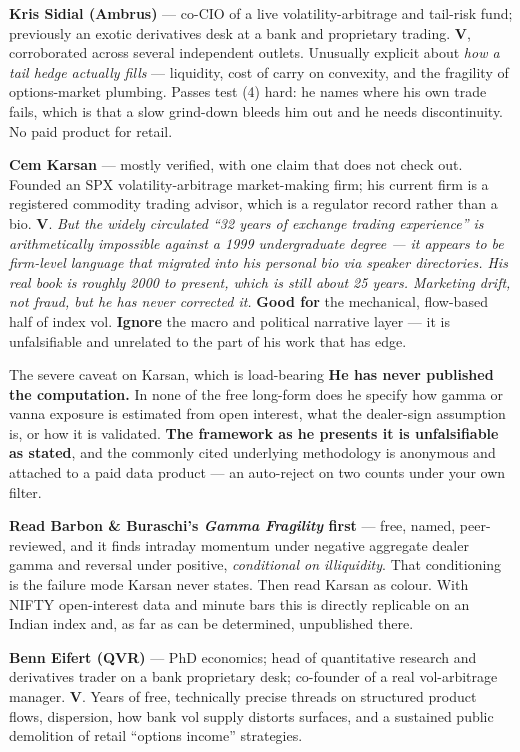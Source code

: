 \documentclass[11pt,a4paper]{article}
\begin{document}
\textbf{Kris Sidial (Ambrus)} --- co-CIO of a live volatility-arbitrage and
tail-risk fund; previously an exotic derivatives desk at a bank and proprietary
trading. \textbf{V}, corroborated across several independent outlets. Unusually
explicit about \emph{how a tail hedge actually fills} --- liquidity, cost of carry
on convexity, and the fragility of options-market plumbing. Passes test (4) hard:
he names where his own trade fails, which is that a slow grind-down bleeds him out
and he needs discontinuity. No paid product for retail.

\textbf{Cem Karsan} --- mostly verified, with one claim that does not check out.
Founded an SPX volatility-arbitrage market-making firm; his current firm is a
registered commodity trading advisor, which is a regulator record rather than a
bio. \textbf{V}. \emph{But the widely circulated ``32 years of exchange trading
experience'' is arithmetically impossible against a 1999 undergraduate degree ---
it appears to be firm-level language that migrated into his personal bio via
speaker directories. His real book is roughly 2000 to present, which is still
about 25 years. Marketing drift, not fraud, but he has never corrected it.}
\textbf{Good for} the mechanical, flow-based half of index vol.
\textbf{Ignore} the macro and political narrative layer --- it is unfalsifiable
and unrelated to the part of his work that has edge.

\begin{keyfact}{The severe caveat on Karsan, which is load-bearing}
\textbf{He has never published the computation.} In none of the free long-form
does he specify how gamma or vanna exposure is estimated from open interest, what
the dealer-sign assumption is, or how it is validated. \textbf{The framework as he
presents it is unfalsifiable as stated}, and the commonly cited underlying
methodology is anonymous and attached to a paid data product --- an auto-reject on
two counts under your own filter.

\textbf{Read Barbon \& Buraschi's \emph{Gamma Fragility} first} --- free, named,
peer-reviewed, and it finds intraday momentum under negative aggregate dealer gamma
and reversal under positive, \emph{conditional on illiquidity}. That conditioning
is the failure mode Karsan never states. Then read Karsan as colour. With NIFTY
open-interest data and minute bars this is directly replicable on an Indian index
and, as far as can be determined, unpublished there.
\end{keyfact}

\textbf{Benn Eifert (QVR)} --- PhD economics; head of quantitative research and
derivatives trader on a bank proprietary desk; co-founder of a real vol-arbitrage
manager. \textbf{V}. Years of free, technically precise threads on structured
product flows, dispersion, how bank vol supply distorts surfaces, and a sustained
public demolition of retail ``options income'' strategies.
\end{document}
